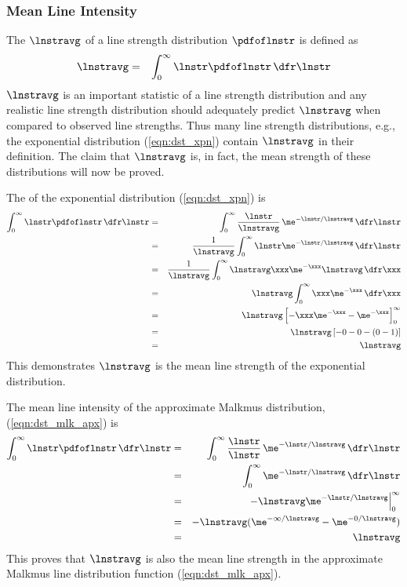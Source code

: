 \documentclass[12pt]{article}
\begin{document}
\subsubsection[Mean Line Intensity]{Mean Line Intensity}\label{sxn:lnstr_dst_avg}
The  $\lnstravg$ of a line strength
distribution $\pdfoflnstr$ is defined as
\begin{eqnarray}
\lnstravg & = & \int_{0}^{\infty} \lnstr \pdfoflnstr \,\dfr\lnstr
\label{eqn:lnstr_avg_dfn}
\end{eqnarray}
$\lnstravg$ is an important statistic of a line strength distribution 
and any realistic line strength distribution should adequately predict
$\lnstravg$ when compared to observed line strengths.
Thus many line strength distributions, e.g., the exponential
distribution (\ref{eqn:dst_xpn}) contain $\lnstravg$ in their
definition. 
The claim that $\lnstravg$ is, in fact, the mean strength of these
distributions will now be proved.

The  of the exponential distribution
(\ref{eqn:dst_xpn}) is 
\begin{eqnarray}
\int_{0}^{\infty} \lnstr \pdfoflnstr \,\dfr\lnstr & = & 
\int_{0}^{\infty} \frac{\lnstr}{\lnstravg} \, \me^{-\lnstr/\lnstravg} \,\dfr\lnstr
\nonumber \\
& = & \frac{1}{\lnstravg} \int_{0}^{\infty} \lnstr \me^{-\lnstr/\lnstravg} \,\dfr\lnstr \nonumber \\
& = & \frac{1}{\lnstravg} \int_{0}^{\infty} \lnstravg \xxx \me^{-\xxx}
\lnstravg \,\dfr\xxx \nonumber \\
& = & \lnstravg \int_{0}^{\infty} \xxx \me^{-\xxx} \,\dfr\xxx \nonumber \\
& = & \lnstravg \left[ -\xxx \me^{-\xxx} - \me^{-\xxx} \right]_{0}^{\infty} \nonumber \\
& = & \lnstravg \left[ -0 - 0 - (0 - 1) \right] \nonumber \\
& = & \lnstravg
\label{eqn:lnstr_avg_xpn}
\end{eqnarray}
This demonstrates $\lnstravg$ is the mean line strength of the
exponential distribution.

The mean line intensity of the approximate Malkmus distribution,
(\ref{eqn:dst_mlk_apx}) is 
\begin{eqnarray}
\int_{0}^{\infty} \lnstr \pdfoflnstr \,\dfr\lnstr & = & 
\int_{0}^{\infty} \frac{\lnstr}{\lnstr} \, \me^{-\lnstr/\lnstravg} \,\dfr\lnstr
\nonumber \\
& = & \int_{0}^{\infty} \me^{-\lnstr/\lnstravg} \,\dfr\lnstr \nonumber \\
& = & \left. -\lnstravg \me^{-\lnstr/\lnstravg} \right|_{0}^{\infty} \nonumber \\
& = & -\lnstravg ( \me^{-\infty/\lnstravg} - \me^{-0/\lnstravg} ) \nonumber \\
& = & \lnstravg
\label{eqn:lnstr_avg_mlk_apx}
\end{eqnarray}
This proves that $\lnstravg$ is also the mean line strength in the 
approximate Malkmus line distribution function
(\ref{eqn:dst_mlk_apx}).  
\end{document}
